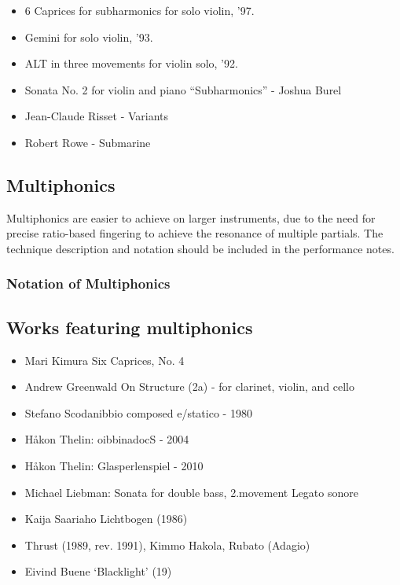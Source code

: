 \begin{itemize}
    \item 6 Caprices for subharmonics for solo violin, '97.
    \item Gemini for solo violin, '93.
    \item ALT in three movements for violin solo, '92.
    \item Sonata No. 2 for violin and piano “Subharmonics” - Joshua Burel
    \item Jean-Claude Risset - Variants
    \item Robert Rowe - Submarine
\end{itemize}

\subsection{Multiphonics} \label{sec:multiphonics}
Multiphonics are easier to achieve on larger instruments, due to the need for precise ratio-based fingering to achieve the resonance of multiple partials.
The technique description and notation should be included in the performance notes.
\lipsum[4]

\subsubsection{Notation of Multiphonics}

\subsection{Works featuring multiphonics} \label{sec:multiphonicsLiterature}

\begin{itemize}
    \item Mari Kimura Six Caprices, No. 4 
    \item Andrew Greenwald On Structure (2a) - for clarinet, violin, and cello
    \item Stefano Scodanibbio composed e/statico - 1980
    \item Håkon Thelin: oibbinadocS - 2004
    \item Håkon Thelin: Glasperlenspiel - 2010
    \item Michael Liebman: Sonata for double bass, 2.movement Legato sonore
    \item Kaija Saariaho Lichtbogen (1986)
    \item Thrust (1989, rev. 1991),  Kimmo Hakola, Rubato (Adagio) 
    \item Eivind Buene `Blacklight' (19)
\end{itemize}

